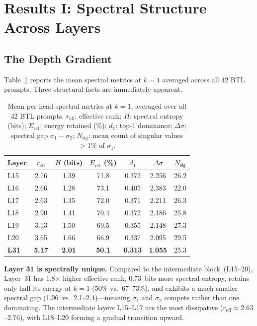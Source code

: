 \documentclass{article}
\begin{document}
\section{Results I: Spectral Structure Across Layers}
\label{sec:spectral}

\subsection{The Depth Gradient}

Table~\ref{tab:spectral} reports the mean spectral metrics at $k=1$ averaged
across all 42 BTL prompts.  Three structural facts are immediately apparent.

\begin{table}[h]
\centering
\caption{Mean per-head spectral metrics at $k=1$, averaged over all 42 BTL prompts.
$r_\text{eff}$: effective rank; $H$: spectral entropy (bits); $E_\text{ret}$: energy
retained (\%); $d_1$: top-1 dominance; $\Delta\sigma$: spectral gap $\sigma_1-\sigma_2$;
$N_\text{sig}$: mean count of singular values $>1\%$ of $\sigma_1$.}
\label{tab:spectral}
\begin{tabular}{lcccccc}
\toprule
\textbf{Layer} & $r_\text{eff}$ & $H$ (bits) & $E_\text{ret}$ (\%) & $d_1$ & $\Delta\sigma$ & $N_\text{sig}$ \\
\midrule
L15 & 2.76 & 1.39 & 71.8 & 0.372 & 2.256 & 26.2 \\
L16 & 2.66 & 1.28 & 73.1 & 0.405 & 2.383 & 22.0 \\
L17 & 2.63 & 1.35 & 72.0 & 0.371 & 2.211 & 26.3 \\
L18 & 2.90 & 1.41 & 70.4 & 0.372 & 2.186 & 25.8 \\
L19 & 3.13 & 1.50 & 69.5 & 0.355 & 2.148 & 27.3 \\
L20 & 3.65 & 1.66 & 66.9 & 0.337 & 2.095 & 29.5 \\
\textbf{L31} & \textbf{5.17} & \textbf{2.01} & \textbf{50.1} & \textbf{0.313} & \textbf{1.055} & 25.3 \\
\bottomrule
\end{tabular}
\end{table}

\textbf{Layer 31 is spectrally unique.}
Compared to the intermediate block~(L15--20), Layer~31 has 1.8$\times$ higher
effective rank, 0.73~bits more spectral entropy, retains only half its energy at
$k=1$ (50\% vs.\ 67--73\%), and exhibits a much smaller spectral gap
(1.06~vs.\ 2.1--2.4)---meaning $\sigma_1$ and $\sigma_2$ compete rather than one
dominating.  The intermediate layers L15--L17 are the most dissipative
($r_\text{eff}\!\approx\!2.63$--$2.76$), with L18--L20 forming a gradual
transition upward.
\end{document}
